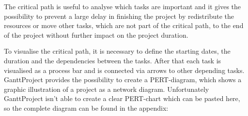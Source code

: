 The critical path is useful to analyse which tasks are important and it gives
the possibility to prevent a large delay in finishing the project by
redistribute the resources or move other tasks, which are not part of the
critical path, to the end of the project without further impact on the project
duration.

To visualise the critical path, it is necessary to define the starting dates,
the duration and the dependencies between the tasks. After that each task is
visualised as a process bar and is connected via arrows to other depending
tasks. GanttProject provides the possibility to create a PERT-diagram, which
shows a graphic illustration of a project as a network diagram. Unfortunately
GanttProject isn't able to create a clear PERT-chart which can be pasted here,
so the complete diagram can be found in the appendix:

\textbf{\color{red}{des PERT-Diagramm vom Markus fehlt noch -.-}}
